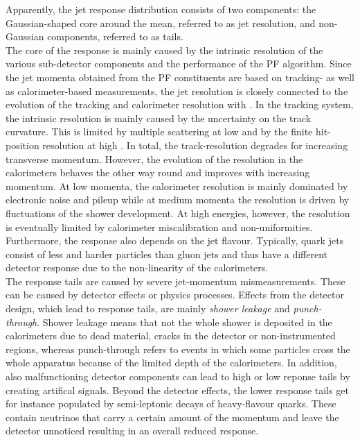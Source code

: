 Apparently, the jet response distribution consists of two components: the Gaussian-shaped core around the mean, referred to as jet resolution, and non-Gaussian components, referred to as tails. \\
The core of the response is mainly caused by the intrinsic resolution of the various sub-detector components and the performance of the PF algorithm. Since the jet momenta obtained from the PF constituents are based on tracking- as well as calorimeter-based measurements, the jet resolution is closely connected to the evolution of the tracking and calorimeter resolution with \pt. In the tracking system, the intrinsic resolution is mainly caused by the uncertainty on the track curvature. This is limited by multiple scattering at low \pt and by the finite hit-position resolution at high \pt. In total, the track-\pt resolution degrades for increasing transverse momentum. However, the evolution of the resolution in the calorimeters behaves the other way round and improves with increasing momentum. At low momenta, the calorimeter resolution is mainly dominated by electronic noise and pileup while at medium momenta the resolution is driven by fluctuations of the shower development. At high energies, however, the resolution is eventually limited by calorimeter miscalibration and non-uniformities. Furthermore, the response also depends on the jet flavour. Typically, quark jets consist of less and harder particles than gluon jets and thus have a different detector response due to the non-linearity of the calorimeters.  \\
The response tails are caused by severe jet-momentum mismeasurements. These can be caused by detector effects or physics processes. Effects from the detector design, which lead to response tails, are mainly \textit{shower leakage} and \textit{punch-through}. Shower leakage means that not the whole shower is deposited in the calorimeters due to dead material, cracks in the detector or non-instrumented regions, whereas punch-through refers to events in which some particles cross the whole apparatus because of the limited depth of the calorimeters. In addition, also malfunctioning detector components can lead to high or low reponse tails by creating artifical signals. Beyond the detector effects, the lower response tails get for instance populated by semi-leptonic decays of heavy-flavour quarks. These contain neutrinos that carry a certain amount of the momentum and leave the detector unnoticed resulting in an overall reduced response. 


